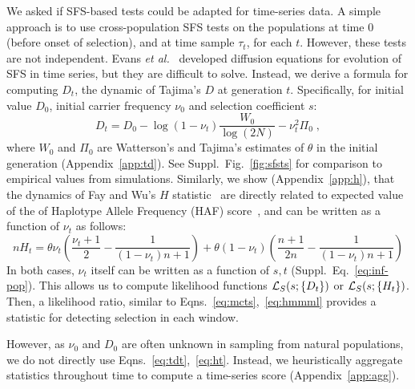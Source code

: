 We asked if SFS-based tests could be adapted for time-series data. A
simple approach is to use cross-population SFS tests on the
populations at time $0$ (before onset of selection), and at time
sample $\tau_t$, for each $t$. However, these tests are not
independent. Evans \emph{et al.}~\cite{evans2007non} developed
diffusion equations for evolution of SFS in time series, but they are
difficult to solve. Instead, we derive a formula for computing $D_t$,
the dynamic of Tajima's $D$ at generation $t$. Specifically, for
initial value $D_0$, initial carrier frequency $\nu_0$ and 
selection coefficient $s$:
\begin{equation}
  D_t=D_0-\log(1-\nu_t) \frac{W_0}{\log(2N)} -\nu_t^2 \Pi_0\;,
  \label{eq:tdt}    
\end{equation}
where $W_0$ and $\Pi_0$ are Watterson's and Tajima's estimates of
$\theta$ in the initial generation (Appendix~\ref{app:td}).  See
Suppl.~Fig.~\ref{fig:sfsts} for comparison to empirical values from
simulations. Similarly, we show (Appendix~\ref{app:h}), that the
dynamics of Fay and Wu's $H$ statistic~\cite{fay2000hitchhiking} are
directly related to expected value of the of Haplotype Allele
Frequency (HAF) score~\cite{ronen2015predicting}, and can be written
as a function of $\nu_t$ as follows:
\begin{equation}
  nH_t= \theta \nu_t \left(\frac{\nu_t+1}{2} -
    \frac{1}{(1-\nu_t)n+1}\right) + \theta
  (1-\nu_t)\left(\frac{n+1}{2n}-\frac{1}{(1-\nu_t)n+1}\right)
  \label{eq:ht}
\end{equation}	
In both cases, $\nu_t$ itself can be written as a function of $s,t$
(Suppl.~Eq.~\ref{eq:inf-pop}). This allows us to compute likelihood
functions ${\cal L}_S(s; \{D_t\})$ or ${\cal L}_S(s; \{H_t\})$. Then, a
likelihood ratio, similar to Eqns.~\ref{eq:mcts},~\ref{eq:hmmml}
provides a statistic for detecting selection in each window. 

However, as $\nu_0$ and $D_0$ are often unknown in sampling from
natural populations, we do not directly use
Eqns.~\ref{eq:tdt},~\ref{eq:ht}. Instead, we heuristically aggregate
statistics throughout time to compute a time-series score
(Appendix~\ref{app:agg}).


		


